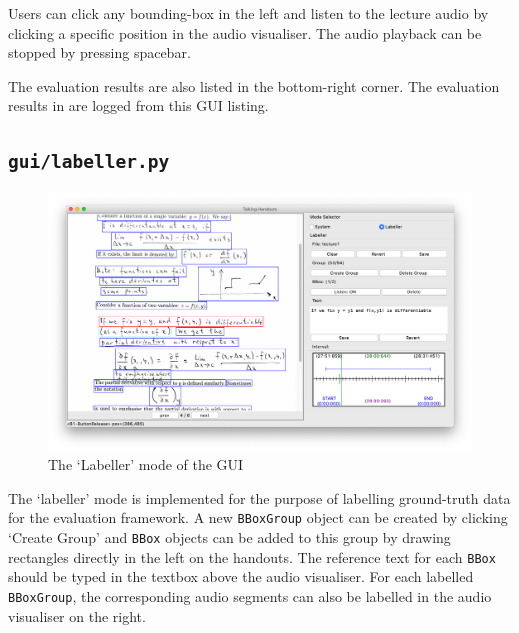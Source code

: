 Users can click any bounding-box in the left and listen to the lecture audio by clicking a specific position in the audio visualiser. The audio playback can be stopped by pressing spacebar. 

The evaluation results are also listed in the bottom-right corner. The evaluation results in  are logged from this GUI listing.

\subsection{\texttt{gui/labeller.py}}

\begin{figure}[!ht]
    \centering
    \includegraphics[width=.9\textwidth]{gui-labeller.png}
    \caption{The `Labeller' mode of the GUI}
    \label{fig:gui-labeller}
\end{figure}

The `labeller' mode is implemented for the purpose of labelling ground-truth data for the evaluation framework. A new \texttt{BBoxGroup} object can be created by clicking `Create Group' and \texttt{BBox} objects can be added to this group by drawing rectangles directly in the left on the handouts. The reference text for each \texttt{BBox} should be typed in the textbox above the audio visualiser. For each labelled \texttt{BBoxGroup}, the corresponding audio segments can also be labelled in the audio visualiser on the right.